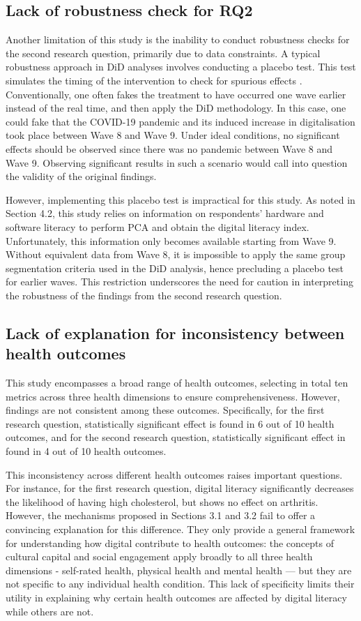 \subsection{Lack of robustness check for RQ2}
Another limitation of this study is the inability to conduct robustness checks for the second research question, primarily due to data constraints. A typical robustness approach in DiD analyses involves conducting a placebo test. This test simulates the timing of the intervention to check for spurious effects \parencite{slusky_significant_2017}. Conventionally, one often fakes the treatment to have occurred one wave earlier instead of the real time, and then apply the DiD methodology. In this case, one could fake that the COVID-19 pandemic and its induced increase in digitalisation took place between Wave 8 and Wave 9. Under ideal conditions, no significant effects should be observed since there was no pandemic between Wave 8 and Wave 9. Observing significant results in such a scenario would call into question the validity of the original findings.

However, implementing this placebo test is impractical for this study. As noted in Section 4.2, this study relies on information on respondents' hardware and software literacy to perform PCA and obtain the digital literacy index. Unfortunately, this information only becomes available starting from Wave 9. Without equivalent data from Wave 8, it is impossible to apply the same group segmentation criteria used in the DiD analysis, hence precluding a placebo test for earlier waves. This restriction underscores the need for caution in interpreting the robustness of the findings from the second research question.

\subsection{Lack of explanation for inconsistency between health outcomes}
This study encompasses a broad range of health outcomes, selecting in total ten metrics across three health dimensions to ensure comprehensiveness. However, findings are not consistent among these outcomes. Specifically, for the first research question, statistically significant effect is found in 6 out of 10 health outcomes, and for the second research question, statistically significant effect in found in 4 out of 10 health outcomes.

This inconsistency across different health outcomes raises important questions. For instance, for the first research question, digital literacy significantly decreases the likelihood of having high cholesterol, but shows no effect on arthritis. However, the mechanisms proposed in Sections 3.1 and 3.2 fail to offer a convincing explanation for this difference. They only provide a general framework for understanding how digital contribute to health outcomes: the concepts of cultural capital and social engagement apply broadly to all three health dimensions - self-rated health, physical health and mental health — but they are not specific to any individual health condition. This lack of specificity limits their utility in explaining why certain health outcomes are affected by digital literacy while others are not.

